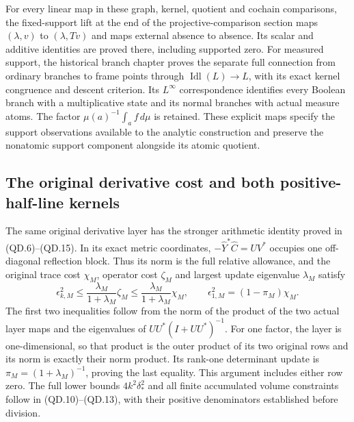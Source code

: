 For every linear map in these graph, kernel, quotient and
cochain comparisons, the fixed-support lift at the end of the
projective-comparison section maps \((\lambda,v)\) to
\((\lambda,Tv)\) and maps external absence to absence.
Its scalar and additive identities are proved there, including
supported zero.  For measured support, the historical branch
chapter proves the separate full connection from ordinary branches
to frame points through \(\operatorname{Idl}(L)\to L\),
with its exact kernel congruence and descent criterion.  Its
\(L^\infty\) correspondence identifies every Boolean branch
with a multiplicative state and its normal branches with actual
measure atoms.  The factor \(\mu(a)^{-1}\int_a f\,d\mu\)
is retained.  These explicit maps specify the support observations
available to the analytic construction and preserve the nonatomic
support component alongside its atomic quotient.

\subsection{The original derivative cost and both positive-half-line kernels}

The same original derivative layer has the stronger arithmetic identity
proved in (QD.6)--(QD.15). In its exact metric coordinates,
\(-\widehat Y^*\widehat C=UV^*\) occupies one off-diagonal
reflection block. Thus its norm is the full relative allowance,
and the original trace cost \(\chi_M\), operator cost \(\zeta_M\)
and largest update eigenvalue \(\lambda_M\) satisfy
\[
 \epsilon_{k,M}^2\leq
        \frac{\lambda_M}{1+\lambda_M}\zeta_M
 \leq\frac{\lambda_M}{1+\lambda_M}\chi_M,
 \qquad
 \epsilon_{1,M}^2=(1-\pi_M)\chi_M.
 \tag{R15}
\]
The first two inequalities follow from the norm of the product of
the two actual layer maps and the eigenvalues of
\(UU^*(I+UU^*)^{-1}\). For one factor, the layer is
one-dimensional, so that product is the outer product of its two
original rows and its norm is exactly their norm product. Its
rank-one determinant update is \(\pi_M=(1+\lambda_M)^{-1}\),
proving the last equality. This argument includes either row zero.
The full lower bounds \(4k^2\delta_*^2\) and all finite accumulated
volume constraints follow in (QD.10)--(QD.13), with their positive
denominators established before division.

